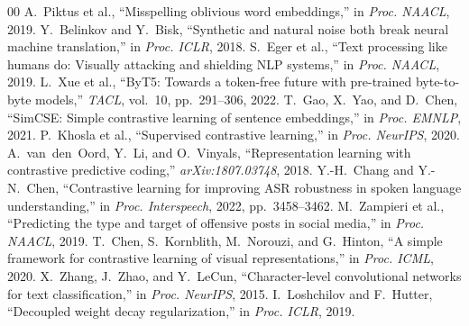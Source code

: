 \documentclass[conference]{IEEEtran}
\begin{document}
\begin{thebibliography}{00}
 A.~Piktus et al., ``Misspelling oblivious word embeddings,'' in \textit{Proc. NAACL}, 2019.
 Y.~Belinkov and Y.~Bisk, ``Synthetic and natural noise both break neural machine translation,'' in \textit{Proc. ICLR}, 2018.
 S.~Eger et al., ``Text processing like humans do: Visually attacking and shielding NLP systems,'' in \textit{Proc. NAACL}, 2019.
 L.~Xue et al., ``ByT5: Towards a token-free future with pre-trained byte-to-byte models,'' \textit{TACL}, vol.~10, pp.~291--306, 2022.
 T.~Gao, X.~Yao, and D.~Chen, ``SimCSE: Simple contrastive learning of sentence embeddings,'' in \textit{Proc. EMNLP}, 2021.
 P.~Khosla et al., ``Supervised contrastive learning,'' in \textit{Proc. NeurIPS}, 2020.
 A.~van~den~Oord, Y.~Li, and O.~Vinyals, ``Representation learning with contrastive predictive coding,'' \textit{arXiv:1807.03748}, 2018.
 Y.-H.~Chang and Y.-N.~Chen, ``Contrastive learning for improving ASR robustness in spoken language understanding,'' in \textit{Proc. Interspeech}, 2022, pp.~3458--3462.
 M.~Zampieri et al., ``Predicting the type and target of offensive posts in social media,'' in \textit{Proc. NAACL}, 2019.
 T.~Chen, S.~Kornblith, M.~Norouzi, and G.~Hinton, ``A simple framework for contrastive learning of visual representations,'' in \textit{Proc. ICML}, 2020.
 X.~Zhang, J.~Zhao, and Y.~LeCun, ``Character-level convolutional networks for text classification,'' in \textit{Proc. NeurIPS}, 2015.
 I.~Loshchilov and F.~Hutter, ``Decoupled weight decay regularization,'' in \textit{Proc. ICLR}, 2019.
\end{thebibliography}
\end{document}
